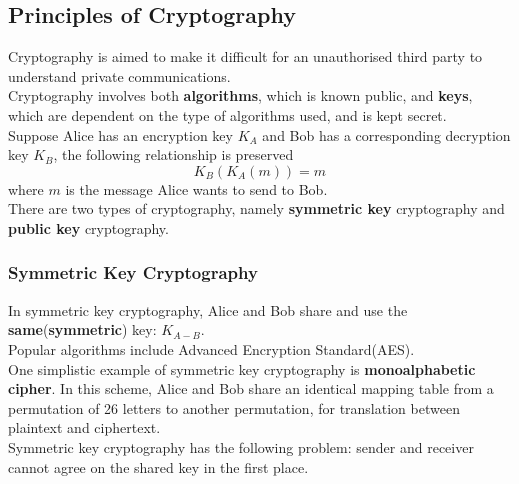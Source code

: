 \documentclass[12pt]{article}
\theoremstyle{definition}
\begin{document}
\subsection{Principles of Cryptography}
Cryptography is aimed to make it difficult for an unauthorised third party to understand private communications.\\
Cryptography involves both \textbf{algorithms}, which is known public, and \textbf{keys}, which are dependent on the type of algorithms used, and is kept secret.\\
Suppose Alice has an encryption key $K_A$ and Bob has a corresponding decryption key $K_B$, the following relationship is preserved
\[
K_B(K_A(m))=m
\]
where $m$ is the message Alice wants to send to Bob.\\
There are two types of cryptography, namely \textbf{symmetric key} cryptography and \textbf{public key} cryptography.
\subsubsection{Symmetric Key Cryptography}
In symmetric key cryptography, Alice and Bob share and use the \textbf{same}(\textbf{symmetric}) key: $K_{A-B}$.\\Popular algorithms include Advanced Encryption Standard(AES).\\
One simplistic example of symmetric key cryptography is \textbf{monoalphabetic cipher}. In this scheme, Alice and Bob share an identical mapping table from a permutation of 26 letters to another permutation, for translation between plaintext and ciphertext.\\
Symmetric key cryptography has the following problem: sender and receiver cannot agree on the shared key in the first place.
\end{document}

